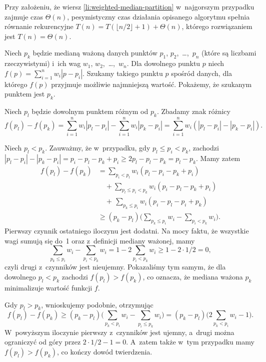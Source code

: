 Przy założeniu, że wiersz \ref{li:weighted-median-partition} w~najgorszym przypadku zajmuje czas $\Theta(n)$, pesymistyczny czas działania opisanego algorytmu spełnia równanie rekurencyjne $T(n)=T(\lfloor n/2\rfloor+1)+\Theta(n)$, którego rozwiązaniem jest $T(n)=\Theta(n)$.

\subproblem %
Niech $p_k$ będzie medianą ważoną danych punktów $p_1$, $p_2$,~\dots,~$p_n$ (które są liczbami rzeczywistymi) i~ich wag $w_1$, $w_2$,~\dots,~$w_n$. Dla dowolnego punktu $p$ niech $f(p)=\sum_{i=1}^nw_i|p-p_i|$. Szukamy takiego punktu $p$ spośród danych, dla którego $f(p)$ przyjmuje możliwie najmniejszą wartość. Pokażemy, że szukanym punktem jest $p_k$.

Niech $p_l$ będzie dowolnym punktem różnym od $p_k$. Zbadamy znak różnicy
\[
    f(p_l)-f(p_k) = \sum_{i=1}^nw_i|p_l-p_i|-\sum_{i=1}^nw_i|p_k-p_i| = \sum_{i=1}^nw_i(|p_l-p_i|-|p_k-p_i|).
\]

Niech $p_l<p_k$. Zauważmy, że w~przypadku, gdy $p_l\le p_i<p_k$, zachodzi $|p_l-p_i|-|p_k-p_i|=p_i-p_l-p_k+p_i\ge2p_l-p_l-p_k=p_l-p_k$. Mamy zatem
\begin{align*}
    f(p_l)-f(p_k) &= \sum_{p_i<p_l}w_i(p_l-p_i-p_k+p_i) \\
	&\quad {}+\!\!\!\sum_{p_l\le p_i<p_k}\!\!\!\!w_i(p_i-p_l-p_k+p_i) \\
	&\quad {}+\,\sum_{p_k\le p_i}w_i(p_i-p_l-p_i+p_k) \\
	&\ge (p_k-p_l)\biggl(\sum_{p_k\le p_i}w_i-\sum_{p_i<p_k}w_i\biggr).
\end{align*}
Pierwszy czynnik ostatniego iloczynu jest dodatni. Na mocy faktu, że wszystkie wagi sumują się do~1 oraz z~definicji mediany ważonej, mamy
\[
    \sum_{p_k\le p_i}w_i-\sum_{p_i<p_k}w_i = 1-2\sum_{p_i<p_k}w_i \ge 1-2\cdot1/2 = 0,
\]
czyli drugi z~czynników jest nieujemny. Pokazaliśmy tym samym, że dla dowolnego $p_l<p_k$ zachodzi $f(p_l)>f(p_k)$, co oznacza, że mediana ważona $p_k$ minimalizuje wartość funkcji $f$.

Gdy $p_l>p_k$, wnioskujemy podobnie, otrzymując
\[
    f(p_l)-f(p_k) \ge (p_k-p_l)\biggl(\sum_{p_k<p_i}w_i-\sum_{p_i\le p_k}w_i\biggr) = (p_k-p_l)\biggl(2\sum_{p_k<p_i}w_i-1\biggr).
\]
W~powyższym iloczynie pierwszy z~czynników jest ujemny, a~drugi można ograniczyć od góry przez $2\cdot1/2-1=0$. A~zatem także w~tym przypadku mamy $f(p_l)>f(p_k)$, co kończy dowód twierdzenia.

